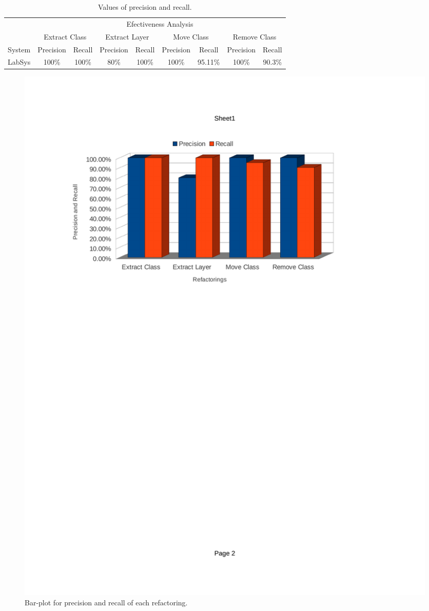 \begin{table}[h]
\centering
\caption{Values of precision and recall.\label{table:precision_recall}}
{\footnotesize{}}%
\setlength{\tabcolsep}{0.0em}
{\renewcommand{\arraystretch}{0.5}
\begin{tabular}{|c|c|c|c|c|c|c|c|c|}
\cline{2-9} 
\multicolumn{1}{c|}{} & \multicolumn{8}{c|}{{\footnotesize{Efectiveness Analysis}}}\tabularnewline
\cline{2-9} 
\multicolumn{1}{c|}{} & \multicolumn{2}{c|}{{\footnotesize{Extract Class }}} & \multicolumn{2}{c|}{{\footnotesize{Extract Layer}}} & \multicolumn{2}{c|}{{\footnotesize{Move Class}}} & \multicolumn{2}{c|}{{\footnotesize{Remove Class}}}\tabularnewline
\hline 
{\footnotesize{System}} & {\footnotesize{Precision}} & {\footnotesize{Recall}} & {\footnotesize{Precision}} & {\footnotesize{Recall}} & {\footnotesize{Precision}} & {\footnotesize{Recall}} & {\footnotesize{Precision}} & {\footnotesize{Recall}}\tabularnewline
\hline 
{\footnotesize{LabSys}} & {\footnotesize{100\%}} & {\footnotesize{100\%}} & {\footnotesize{80\%}} & {\footnotesize{100\%}} & {\footnotesize{100\%}} & {\footnotesize{95.11\%}} & {\footnotesize{100\%}} & {\footnotesize{90.3\%}}\tabularnewline
\hline 
\end{tabular}}
\end{table}

\begin{figure}[h]
	\centering
	\includegraphics[scale=0.62]{figuras/barCharPrecisionAndRecall}
	\caption{Bar-plot for precision and recall of each refactoring.}
	\label{fig:charPrecisionAndRecall}
\end{figure}

